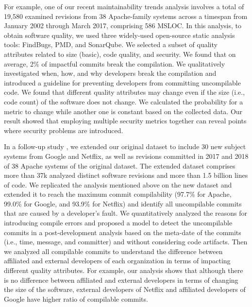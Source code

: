 
For example,
one of our recent maintainability trends analysis \citep{Behnamghader2017qrs} involves a total of 19,580 examined revisions from 38 Apache-family systems across a timespan from January 2002 through March 2017, comprising 586 MSLOC.
In this analysis, to obtain software quality, we used three widely-used open-source static analysis tools: FindBugs, PMD, and SonarQube.
We selected a subset of quality attributes related to size (basic), code quality, and security.
We found that on average, 2\% of impactful commits break the compilation.
We qualitatively investigated when, how, and why developers break the compilation and introduced a guideline for preventing developers from committing uncompilable code.
We found that different quality attributes may change even if the size (i.e., code count) of the software does not change.
We calculated the probability for a metric to change while another one is constant based on the collected data.
Our result showed that employing multiple security metrics together can reveal points where security problems are introduced.

In a follow-up study \citep{Behnamghader2018esem}, we extended our original dataset to include 30 new subject systems from Google and Netflix, as well as revisions committed in 2017 and 2018 of 38 Apache systems of the original dataset.
The extended dataset comprises more than 37k analyzed distinct software revisions and more than 1.5 billion lines of code.
We replicated the analysis mentioned above on the new dataset and extended it to reach the maximum commit compilability (97.7\% for Apache, 99.0\% for Google, and 93.9\% for Netflix) and identify all uncompilable commits that are caused by a developer's fault.
We quantitatively analyzed the reasons for introducing compile errors and proposed a model to detect the uncompilable commits in a post-development analysis based on the meta-date of the commits (i.e., time, message, and committer) and without considering code artifacts.
Then we analyzed all compilable commits to understand the difference between affiliated and external developers of each organization in terms of impacting different quality attributes. 
For example, our analysis shows that although there is no difference between affiliated and external developers in terms of changing the size of the software, external developers of Netflix and affiliated developers of Google have higher ratio of compilable commits.


